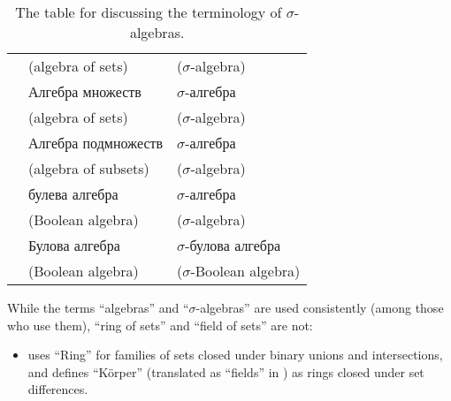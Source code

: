 \begin{remark}
\begin{table}[!ht]
\begin{tabular}{l l l}
                                                                 & \footnotesize (algebra of sets)                       & \footnotesize (\( \sigma \)-algebra)             \\
      \cite[def. 1.2.1; def. 1.2.2]{Богачёв2003МерыТом1}   & Алгебра множеств                                      & \( \sigma \)-алгебра                             \\
                                                                 & \footnotesize (algebra of sets)                       & \footnotesize (\( \sigma \)-algebra)             \\
      \cite[def. II.1.1; def. II.1.4]{Ширяев2007ВероятностиТом1} & Алгебра подмножеств                                   & \( \sigma \)-алгебра                             \\
                                                                 & \footnotesize (algebra of subsets)                    & \footnotesize (\( \sigma \)-algebra)             \\
      \cite[def. 3.1; def. 3.3]{Драганов2022Мерки}     & булева алгебра                                        & \( \sigma \)-алгебра                             \\
                                                                 & \footnotesize (Boolean algebra)                       & \footnotesize (\( \sigma \)-algebra)     \\
      \cite[def. 1.1; def. 1.2]{ДимитровЯнев2007Статистика}      & Булова алгебра                                        & \( \sigma \)-булова алгебра                      \\
                                                                 & \footnotesize (Boolean algebra)                       & \footnotesize (\( \sigma \)-Boolean algebra)     \\
      \bottomrule
    \end{tabular}
    \caption{The table for  discussing the terminology of \( \sigma \)-algebras.}\label{tab:rem:sigma_algebra_terminology}
  \end{table}

  While the terms \enquote{algebras} and \enquote{\( \sigma \)-algebras} are used consistently (among those who use them), \enquote{ring of sets} and \enquote{field of sets} are not:
  \begin{itemize}
    \item {} uses \enquote{Ring} for families of sets closed under binary unions and intersections, and defines \enquote{K\"{o}rper} (translated as \enquote{fields} in \cite[90]{Hausdorff1962Sets}) as rings closed under set differences.


\end{itemize}
\end{remark}
